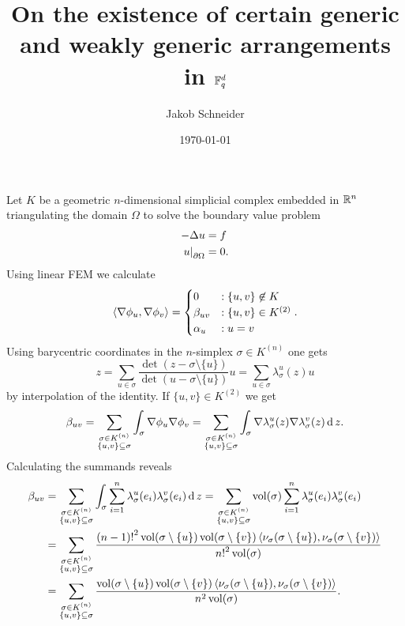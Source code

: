 \message{ !name(NUMFEM.tex)}\documentclass[8pt,a4paper]{article}
\begin{document}

\title{On the existence of certain generic and weakly generic arrangements in $\mathbb{F}_q^d$}
\author{Jakob Schneider}
\date{\today}
\maketitle

Let $K$ be a geometric $n$-dimensional simplicial complex embedded in $\mathbb{R}^n$ triangulating the domain $\Omega$ to solve the boundary value problem
\begin{align}
-\Delta u &= f\\
\left. u\right\vert_{\partial{\Omega}} &= 0\text{.}
\end{align}
Using linear FEM we calculate
\begin{align}
\left\langle \nabla{\phi_u},\nabla{\phi_v} \right\rangle=\begin{cases} 0 &: \{u,v\}\not\in K\\
\beta_{uv} &: \{u,v\}\in K^{(2)}\\
\alpha_u &: u=v
\end{cases}\text{.}
\end{align}
Using barycentric coordinates in the $n$-simplex $\sigma\in K^{(n)}$ one gets
\begin{equation}
z=\sum_{u\in\sigma}{\frac{\det(z-\sigma\setminus\{u\})}{\det(u-\sigma\setminus\{u\})}u}=\sum_{u\in\sigma}{\lambda^u_{\sigma}(z)u}
\end{equation}
by interpolation of the identity. If $\{u,v\}\in K^{(2)}$ we get
\begin{align}
\beta_{uv}=\sum_{\substack{\sigma\in K^{(n)}\\ \{u,v\}\subseteq \sigma}}{\int_{\sigma}{\nabla{\phi_u}\nabla{\phi_v}}}=\sum_{\substack{\sigma\in K^{(n)}\\ \{u,v\}\subseteq \sigma}}{\int_{\sigma}{\nabla{\lambda^u_{\sigma}(z)}\nabla{\lambda^v_{\sigma}(z)}}\operatorname{d}{z}}\text{.}
\end{align}
Calculating the summands reveals
\begin{align}
\beta_{uv} & = \sum_{\substack{\sigma\in K^{(n)}\\ \{u,v\}\subseteq \sigma}}{\int_{\sigma}{\sum_{i=1}^n{\lambda^u_{\sigma}(e_i)\lambda^v_{\sigma}(e_i)}}\operatorname{d}{z}}
= \sum_{\substack{\sigma\in K^{(n)}\\ \{u,v\}\subseteq \sigma}}{\operatorname{vol}(\sigma)\sum_{i=1}^n{\lambda^u_{\sigma}(e_i)\lambda^v_{\sigma}(e_i)}}\\
& = \sum_{\substack{\sigma\in K^{(n)}\\ \{u,v\}\subseteq \sigma}}{\frac{{(n-1)!}^2\operatorname{vol}(\sigma\setminus\{u\})\operatorname{vol}(\sigma\setminus\{v\})\left\langle \nu_{\sigma}(\sigma\setminus\{u\}),\nu_{\sigma}(\sigma\setminus\{v\}) \right\rangle}{{n!}^2\operatorname{vol}(\sigma)}}\\
& = \sum_{\substack{\sigma\in K^{(n)}\\ \{u,v\}\subseteq \sigma}}{\frac{\operatorname{vol}(\sigma\setminus\{u\})\operatorname{vol}(\sigma\setminus\{v\})\left\langle \nu_{\sigma}(\sigma\setminus\{u\}),\nu_{\sigma}(\sigma\setminus\{v\}) \right\rangle}{n^2\operatorname{vol}(\sigma)}}\text{.}
\end{align}
\end{document}
